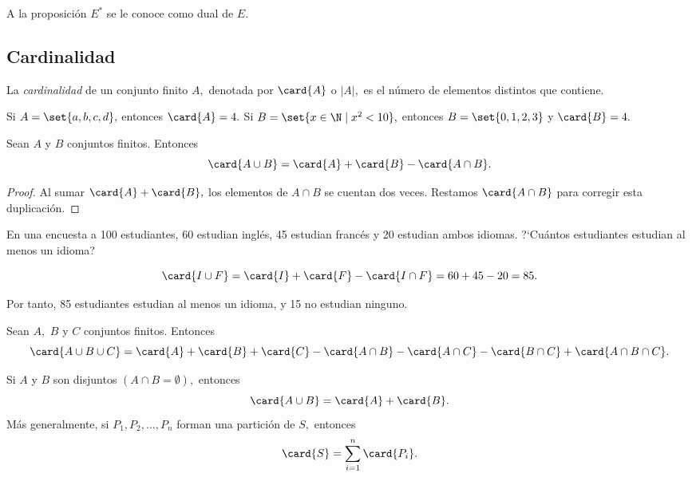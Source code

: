 A la proposición $E^{*}$ se le conoce como dual de $E.$

\subsection{Cardinalidad}

La \emph{cardinalidad} de un conjunto finito $A,$ denotada por $\card{A}$ o $|A|,$ es el número de elementos distintos que contiene.

\begin{problema}
	Si $A = \set{a,b,c,d},$ entonces $\card{A} = 4.$
	Si $B = \set{x \in \N \mid x^{2} < 10},$ entonces $B = \set{0,1,2,3}$ y $\card{B} = 4.$
\end{problema}

\begin{teorema}
	Sean $A$ y $B$ conjuntos finitos.  Entonces
	$$
	\card{A \cup B} = \card{A} + \card{B} - \card{A \cap B}.
	$$
\end{teorema}

\begin{proof}
	Al sumar $\card{A} + \card{B},$ los elementos de $A \cap B$ se cuentan dos veces.  Restamos $\card{A \cap B}$ para corregir esta duplicación.
\end{proof}

\begin{problema}
	En una encuesta a 100 estudiantes, 60 estudian inglés, 45 estudian francés y 20 estudian ambos idiomas.  ?`Cuántos estudiantes estudian al menos un idioma?
	
	$$\card{I \cup F} = \card{I} + \card{F} - \card{I \cap F} = 60 + 45 - 20 = 85.$$
	
	Por tanto, 85 estudiantes estudian al menos un idioma, y 15 no estudian ninguno.
\end{problema}

\begin{teorema}
	Sean $A,$ $B$ y $C$ conjuntos finitos.  Entonces
	$$
	\card{A \cup B \cup C} = \card{A} + \card{B} + \card{C} - \card{A \cap B} - \card{A \cap C} - \card{B \cap C} + \card{A \cap B \cap C}.
	$$
\end{teorema}

\begin{corolario}
	Si $A$ y $B$ son disjuntos $(A \cap B = \emptyset),$ entonces
	$$
	\card{A \cup B} = \card{A} + \card{B}.
	$$
	Más generalmente, si $P_{1}, P_{2}, \dots, P_{n}$ forman una partición de $S,$ entonces
	$$
	\card{S} = \sum_{i=1}^{n} \card{P_{i}}.
	$$
\end{corolario}

